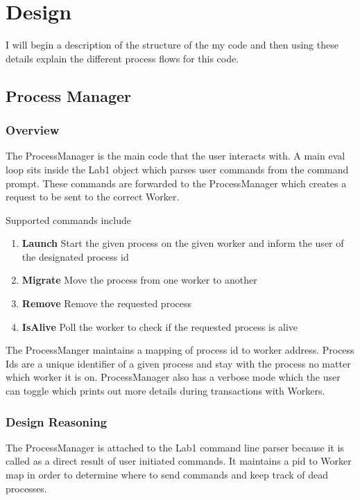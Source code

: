\documentclass[12pt]{article}
\begin{document}
\maketitle


\section{Design}

I will begin a description of the structure of the my code and then using these details explain the different process flows for this code.

\subsection{Process Manager}

\subsubsection{Overview}

The ProcessManager is the main code that the user interacts with. A main eval loop sits inside the Lab1 object which parses user commands from the command prompt. These commands are forwarded to the ProcessManager which creates a request to be sent to the correct Worker.

Supported commands include
\begin{enumerate}
\item \textbf{Launch} Start the given process on the given worker and inform the user of the designated process id
\item \textbf{Migrate} Move the process from one worker to another
\item \textbf{Remove} Remove the requested process
\item \textbf{IsAlive} Poll the worker to check if the requested process is alive
\end{enumerate}

The ProcessManger maintains a mapping of process id to worker address. Process Ids are a unique identifier of a given process and stay with the process no matter which worker it is on. ProcessManager also has a verbose mode which the user can toggle which prints out more details during transactions with Workers.

\subsubsection{Design Reasoning}
The ProcessManager is attached to the Lab1 command line parser because it is called as a direct result of user initiated commands. It maintains a pid to Worker map in order to determine where to send commands and keep track of dead processes.
\end{document}
